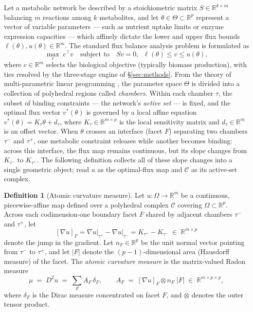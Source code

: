 \documentclass[11pt,a4paper]{article}
\theoremstyle{plain}
\theoremstyle{definition}
\newtheorem{definition}[theorem]{Definition}
\theoremstyle{remark}
\newcommand{\CC}{\mathcal{C}}
\newcommand{\RR}{\mathbb{R}}
\begin{document}
Let a metabolic network be described by a stoichiometric matrix
$S \in \RR^{k \times m}$ balancing $m$ reactions among $k$
metabolites, and let $\theta \in \Theta \subset \RR^p$ represent a
vector of variable parameters --- such as nutrient uptake limits or
enzyme expression capacities --- which affinely dictate the lower and
upper flux bounds $\ell(\theta), u(\theta) \in \RR^m$. The standard
flux balance analysis problem is formulated as
\begin{equation}\label{eq:fba_lp}
\max_{v}\; c^\top v
\quad \text{subject to} \quad
Sv = 0, \;\; \ell(\theta) \le v \le u(\theta),
\end{equation}
where $c \in \RR^m$ selects the biological objective (typically
biomass production), with ties resolved by the three-stage engine of
\S\ref{sec:methods}. From the theory of multi-parametric linear
programming \citep{borrelli2003}, the parameter space $\Theta$ is
divided into a collection of polyhedral regions called
\emph{chambers}. Within each chamber $\tau$, the subset of binding
constraints --- the network's \emph{active set} --- is fixed, and the
optimal flux vector $v^*(\theta)$ is governed by a local affine
equation $v^*(\theta) = K_\tau \theta + d_\tau$, where
$K_\tau \in \RR^{m \times p}$ is the local sensitivity matrix and
$d_\tau \in \RR^m$ is an offset vector. When $\theta$ crosses an
interface (facet $F$) separating two chambers $\tau^-$ and $\tau^+$,
one metabolic constraint releases while another becomes binding:
across this interface, the flux map remains continuous, but its slope
changes from $K_{\tau^-}$ to $K_{\tau^+}$. The following definition
collects all of these slope changes into a single geometric object;
read $u$ as the optimal-flux map and $\CC$ as its active-set
complex.

\begin{definition}[Atomic curvature measure]\label{def:mu}
Let $u : \Omega \to \RR^m$ be a continuous, piecewise-affine map
defined over a polyhedral complex $\CC$ covering $\Omega \subset
\RR^p$. Across each codimension-one boundary facet $F$ shared by
adjacent chambers $\tau^-$ and $\tau^+$, let
\[
[\nabla u]_F
= \left.\nabla u\right|_{\tau^+} - \left.\nabla u\right|_{\tau^-}
= K_{\tau^+} - K_{\tau^-}
\;\in\; \RR^{m \times p}
\]
denote the jump in the gradient. Let $n_F \in \RR^p$ be the unit
normal vector pointing from $\tau^-$ to $\tau^+$, and let $|F|$ denote
the $(p-1)$-dimensional area (Hausdorff measure) of the facet. The
\emph{atomic curvature measure} is the matrix-valued Radon measure
\[
\mu \;=\; D^2 u \;=\; \sum_{F} A_F \, \delta_F,
\qquad
A_F \;=\; [\nabla u]_F \otimes n_F \; |F| \;\in\; \RR^{m \times p \times p},
\]
where $\delta_F$ is the Dirac measure concentrated on facet $F$, and
$\otimes$ denotes the outer tensor product.
\end{definition}
\end{document}
